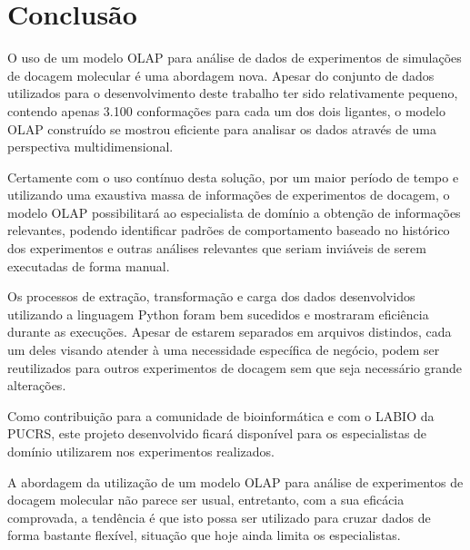 \chapter{Conclusão}

O uso de um modelo OLAP para análise de dados de experimentos de simulações de docagem molecular é uma abordagem nova. Apesar do conjunto de dados utilizados para o desenvolvimento deste trabalho ter sido relativamente pequeno, contendo apenas 3.100 conformações para cada um dos dois ligantes, o modelo OLAP construído se mostrou eficiente para analisar os dados através de uma perspectiva multidimensional.

Certamente com o uso contínuo desta solução, por um maior período de tempo e utilizando uma exaustiva massa de informações de experimentos de docagem, o modelo OLAP possibilitará ao especialista de domínio a obtenção de informações relevantes, podendo identificar padrões de comportamento baseado no histórico dos experimentos e outras análises relevantes que seriam inviáveis de serem executadas de forma manual.

Os processos de extração, transformação e carga dos dados desenvolvidos utilizando a linguagem Python foram bem sucedidos e mostraram eficiência durante as execuções. Apesar de estarem separados em arquivos distindos, cada um deles visando atender à uma necessidade específica de negócio, podem ser reutilizados para outros experimentos de docagem sem que seja necessário grande alterações.

Como contribuição para a comunidade de bioinformática e com o LABIO da PUCRS, este projeto desenvolvido ficará disponível para os especialistas de domínio utilizarem nos experimentos realizados.

A abordagem da utilização de um modelo OLAP para análise de experimentos de docagem molecular não parece ser usual, entretanto, com a sua eficácia comprovada, a tendência é que isto possa ser utilizado para cruzar dados de forma bastante flexível, situação que hoje ainda limita os especialistas.

